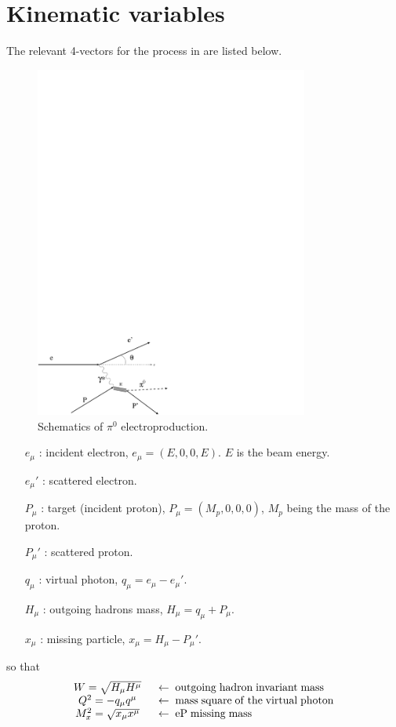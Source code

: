 \chapter{Kinematic variables}\label{sec:kinema}

The relevant 4-vectors for the process in  are listed below.

\begin{figure}[h]
 \begin{center}
  \includegraphics[width =9cm, bb = 0 -50 300 250]{appendix/img/cross}
  \caption[Schematics of  $\pi^0$ electroproduction]
          { Schematics of  $\pi^0$ electroproduction.}
  \label{fig:feyn2}
 \end{center}
\end{figure} 

\begin{itemize}
 \item[$ e_{\mu}$   :] incident electron, $e_{\mu} = (E, 0, 0, E)$. $E$ is the beam energy.
 \item[$ e_{\mu}'$  :] scattered electron.
 \item[$ P_{\mu} $  :] target (incident proton), $ P_{\mu} = (M_p, 0, 0, 0)$, $M_p$ being the mass of the proton.
 \item[$ P_{\mu}'$  :] scattered proton.
 \item[$ q_{\mu}$   :] virtual photon, $q_{\mu}= e_{\mu}-e_{\mu}'$.
 \item[$ H_{\mu}$   :] outgoing hadrons mass, $H_{\mu}=q_{\mu}+P_{\mu}$.
 \item[$ x_{\mu}$   :] missing particle, $x_{\mu}=H_{\mu}-P_{\mu}'$.
\end{itemize}
so that
$$
\begin{array}{c l}
W     =  \sqrt{H_\mu H^\mu} & \;\;\leftarrow\;{\rm outgoing\; hadron\; invariant\; mass} \\
Q^2   = - q_\mu q^\mu&        \;\;\leftarrow\;{\rm mass\; square\;of\;the\;virtual\;photon} \\
M_x^2 =  \sqrt{x_\mu x^\mu} & \;\;\leftarrow\;{\rm eP\; missing\;  mass} \\
\end{array}
$$

